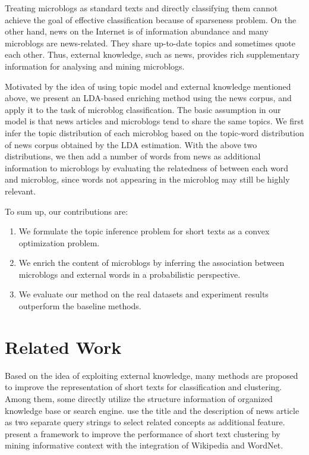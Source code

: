 \documentclass[11pt]{article}
\begin{document}
Treating microblogs as standard texts and directly classifying them cannot achieve the goal of effective classification because of sparseness problem. On the other hand, news on the Internet is of information abundance and many microblogs are news-related. They share up-to-date topics and sometimes quote each other. Thus, external knowledge, such as news, provides rich supplementary information for analysing and mining microblogs.

Motivated by the idea of using topic model and external knowledge mentioned above, we present an LDA-based enriching method using the news corpus, and apply it to the task of microblog classification. The basic assumption in our model is that news articles and microblogs tend to share the same topics. We first infer the topic distribution of each microblog based on the topic-word distribution of news corpus obtained by the LDA estimation. With the above two distributions, we then add a number of words from news as additional information to microblogs by evaluating the relatedness of between each word and microblog, since words not appearing in the microblog may still be highly relevant.

To sum up, our contributions are:
\begin{enumerate}[(1)]\setlength{\itemsep}{0.5ex}
\item We formulate the topic inference problem for short texts as a convex optimization problem.
\item We enrich the content of microblogs by inferring the association between microblogs and external words in a probabilistic perspective.
\item We evaluate our method on the real datasets and experiment results outperform the baseline methods.
\end{enumerate}

\section{Related Work}

Based on the idea of exploiting external knowledge, many methods are proposed to improve the representation of short texts for classification and clustering. Among them, some directly utilize the structure information of organized knowledge base or search engine.  use the title and the description of news article as two separate query strings to select related concepts as additional feature.  present a framework to improve the performance of short text clustering by mining informative context with the integration of Wikipedia and WordNet. 
\end{document}
